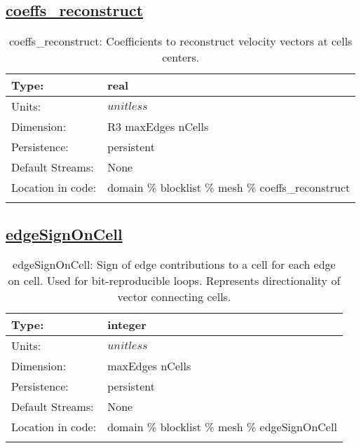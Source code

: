 \subsection[coeffs\_reconstruct]{\hyperref[sec:var_tab_mesh]{coeffs\_reconstruct}}
\label{subsec:var_sec_mesh_coeffs_reconstruct}
\begin{center}
\begin{longtable}{| p{2.0in} | p{4.0in} |}
        \hline 
        Type: & real \\
        \hline 
        Units: & $unitless$ \\
        \hline 
        Dimension: & R3 maxEdges nCells \\
        \hline 
        Persistence: & persistent \\
        \hline 
		 Default Streams: & None \\
        \hline 
		 Location in code: & domain \% blocklist \% mesh \% coeffs\_reconstruct \\
		 \hline 
    \caption{coeffs\_reconstruct: Coefficients to reconstruct velocity vectors at cells centers.}
\end{longtable}
\end{center}
\subsection[edgeSignOnCell]{\hyperref[sec:var_tab_mesh]{edgeSignOnCell}}
\label{subsec:var_sec_mesh_edgeSignOnCell}
\begin{center}
\begin{longtable}{| p{2.0in} | p{4.0in} |}
        \hline 
        Type: & integer \\
        \hline 
        Units: & $unitless$ \\
        \hline 
        Dimension: & maxEdges nCells \\
        \hline 
        Persistence: & persistent \\
        \hline 
		 Default Streams: & None \\
        \hline 
		 Location in code: & domain \% blocklist \% mesh \% edgeSignOnCell \\
		 \hline 
    \caption{edgeSignOnCell: Sign of edge contributions to a cell for each edge on cell. Used for bit-reproducible loops. Represents directionality of vector connecting cells.}
\end{longtable}
\end{center}
